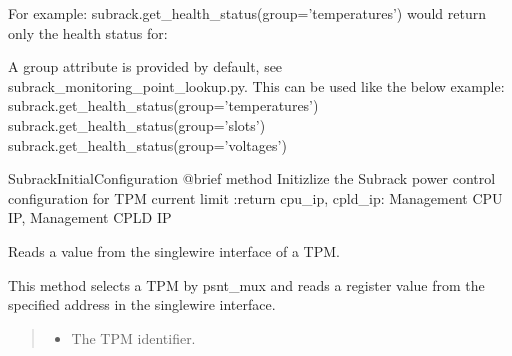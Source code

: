 \documentclass[letterpaper,10pt,english]{sphinxmanual}
\begin{document}
\begin{fulllineitems}
\begin{fulllineitems}
\sphinxAtStartPar
For example:
subrack.get\_health\_status(group=’temperatures’)
would return only the health status for:

\sphinxAtStartPar
A group attribute is provided by default, see subrack\_monitoring\_point\_lookup.py.
This can be used like the below example:
subrack.get\_health\_status(group=’temperatures’)
subrack.get\_health\_status(group=’slots’)
subrack.get\_health\_status(group=’voltages’)

\end{fulllineitems}


\begin{fulllineitems}
\label{\detokenize{apidocs:subrack_management_board.SubrackMngBoard.get_subrack_cpu_cpld_ip}}
\pysigstartsignatures
{}
\pysigstopsignatures
\sphinxAtStartPar
SubrackInitialConfiguration
@brief method Initizlize the Subrack power control configuration for TPM current limit
:return cpu\_ip, cpld\_ip: Management CPU IP, Management CPLD IP

\end{fulllineitems}


\begin{fulllineitems}
\label{\detokenize{apidocs:subrack_management_board.SubrackMngBoard.read_tpm_singlewire}}
\pysigstartsignatures
{}
\pysigstopsignatures
\sphinxAtStartPar
Reads a value from the single\sphinxhyphen{}wire interface of a TPM.

\sphinxAtStartPar
This method selects a TPM by psnt\_mux and reads a register value from the
specified address in the single\sphinxhyphen{}wire interface.
\begin{quote}\begin{description}
\begin{itemize}
\item {} 
\sphinxAtStartPar
{} \textendash{} The TPM identifier.


\end{itemize}
\end{description}
\end{quote}
\end{fulllineitems}
\end{fulllineitems}
\end{document}
